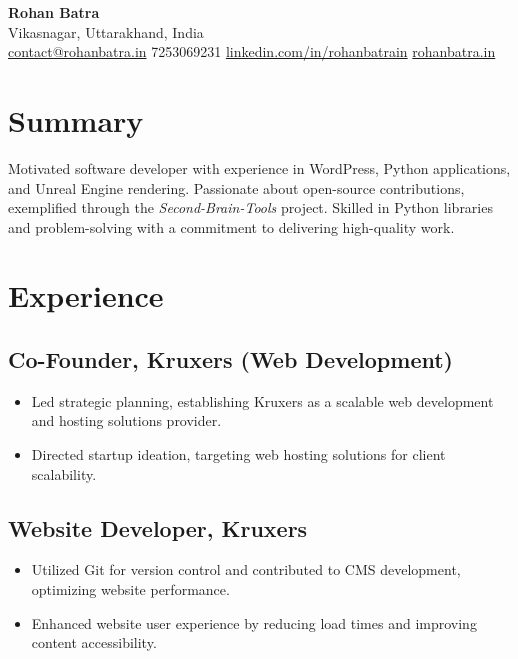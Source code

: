 \documentclass[a4paper,10pt]{article}
\begin{document}
\begin{center}
    {\Huge \textbf{Rohan Batra}} \\[6pt]
    Vikasnagar, Uttarakhand, India \\
    \small \faEnvelope \hspace{0.1cm} \href{mailto:contact@rohanbatra.in}{contact@rohanbatra.in} \quad 
    \faPhone \hspace{0.1cm} 7253069231 \quad 
    \faLinkedinSquare \hspace{0.1cm} \href{https://linkedin.com/in/rohanbatrain}{linkedin.com/in/rohanbatrain} \quad 
    \faGlobe \hspace{0.1cm} \href{https://rohanbatra.in}{rohanbatra.in} \\
\end{center}

\vspace{10pt} %

\section*{Summary}
\noindent
Motivated software developer with experience in WordPress, Python applications, and Unreal Engine rendering. Passionate about open-source contributions, exemplified through the \textit{Second-Brain-Tools} project. Skilled in Python libraries and problem-solving with a commitment to delivering high-quality work.

\section*{Experience}

\subsection*{Co-Founder, Kruxers (Web Development)}
\begin{itemize}[left=0em, itemsep=3pt]
    \item Led strategic planning, establishing Kruxers as a scalable web development and hosting solutions provider.
    \item Directed startup ideation, targeting web hosting solutions for client scalability.
\end{itemize}

\subsection*{Website Developer, Kruxers}
\begin{itemize}[left=0em, itemsep=3pt]
    \item Utilized Git for version control and contributed to CMS development, optimizing website performance.
    \item Enhanced website user experience by reducing load times and improving content accessibility.
\end{itemize}
\end{document}
